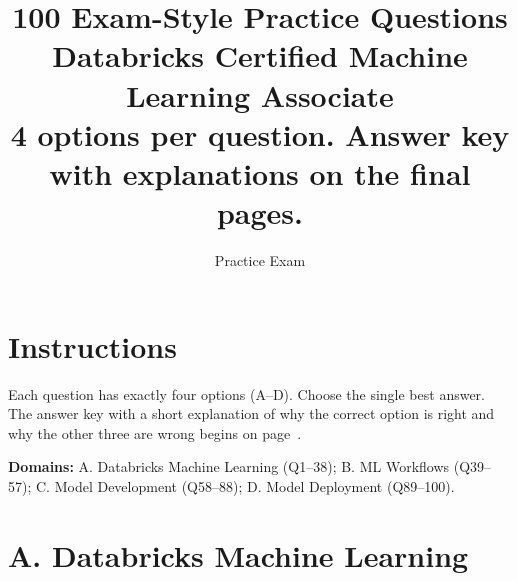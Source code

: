 \documentclass[11pt]{article}
\title{\textbf{100 Exam-Style Practice Questions}\\[4pt]
	\large Databricks Certified \textbf{Machine Learning Associate}\\[2pt]
	\normalsize 4 options per question. Answer key with explanations on the final pages.}
\author{Practice Exam}
\date{}
\begin{document}
	\maketitle
	\tableofcontents
	\newpage
	
	\section*{Instructions}
	Each question has exactly four options (A--D). Choose the single best answer. The answer key with a short explanation of why the correct option is right and why the other three are wrong begins on page~\pageref{sec:key}.
	
	\textbf{Domains:} A. Databricks Machine Learning (Q1--38); B. ML Workflows (Q39--57); C. Model Development (Q58--88); D. Model Deployment (Q89--100).
	\newpage
	
	\section{A. Databricks Machine Learning}
	
\end{document}
